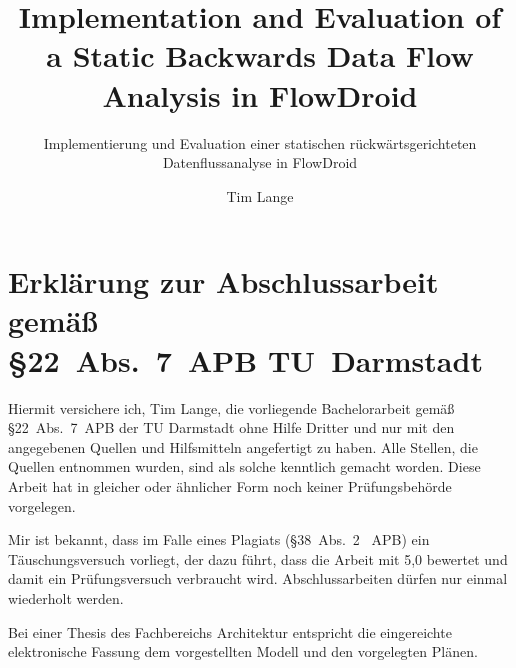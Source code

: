 \documentclass[
	english,
	ruledheaders=section,%
	class=report,%
	thesis={type=bachelor},%
	accentcolor=9c,%
	custommargins=true,%
	marginpar=false,%
	parskip=half-,%
	fontsize=11pt,%
	IMRAD=false
]{tudapub}
\title{Implementation and Evaluation of a Static Backwards Data Flow Analysis in FlowDroid}
\subtitle{Implementierung und Evaluation einer statischen rückwärtsgerichteten Datenflussanalyse in FlowDroid}
\author[T. Lange]{Tim Lange}%
\institute{Fraunhofer SIT}
\begin{document}
\maketitle

\tableofcontents
\newpage

\section*{Erklärung zur Abschlussarbeit gemäß\\ \S{}22~Abs.~7~APB TU~Darmstadt}
\begin{sloppypar}%
Hiermit versichere ich, Tim Lange, die vorliegende Bachelorarbeit gemäß \S{}22~Abs.~7~APB der TU Darmstadt ohne Hilfe Dritter und nur mit den angegebenen Quellen und Hilfsmitteln angefertigt zu haben.
Alle Stellen, die Quellen entnommen wurden, sind als solche kenntlich gemacht worden. Diese Arbeit hat in gleicher oder ähnlicher Form noch keiner Prüfungsbehörde vorgelegen.
\end{sloppypar}%
\par
Mir ist bekannt, dass im Falle eines Plagiats (\S{}38~Abs.~2 ~APB) ein Täuschungsversuch vorliegt, der dazu führt, dass die Arbeit mit 5,0 bewertet und damit ein Prüfungsversuch verbraucht wird. Abschlussarbeiten dürfen nur einmal wiederholt werden.
\par
Bei einer Thesis des Fachbereichs Architektur entspricht die eingereichte elektronische Fassung dem vorgestellten Modell und den vorgelegten Plänen.
\AffidavitSignature










\printbibliography[
	heading=bibintoc,
	title={Bibliography}
]


\end{document}

